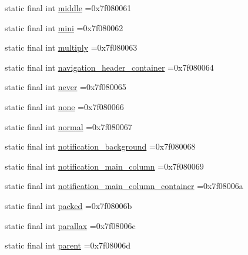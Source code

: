 \begin{DoxyCompactItemize}
\item 
static final int \mbox{\hyperlink{classbr_1_1unb_1_1cic_1_1mp_1_1marketmaster_1_1test_1_1R_1_1id_a30ed33f600cfdfe1e1e93c06ca85b615}{middle}} =0x7f080061
\item 
static final int \mbox{\hyperlink{classbr_1_1unb_1_1cic_1_1mp_1_1marketmaster_1_1test_1_1R_1_1id_a212afa822e93a022b91e2719dd830212}{mini}} =0x7f080062
\item 
static final int \mbox{\hyperlink{classbr_1_1unb_1_1cic_1_1mp_1_1marketmaster_1_1test_1_1R_1_1id_a615e34590418e5833ce313aa5db8ab72}{multiply}} =0x7f080063
\item 
static final int \mbox{\hyperlink{classbr_1_1unb_1_1cic_1_1mp_1_1marketmaster_1_1test_1_1R_1_1id_a7eee101e7bb5f10f92fb23ff621f5325}{navigation\+\_\+header\+\_\+container}} =0x7f080064
\item 
static final int \mbox{\hyperlink{classbr_1_1unb_1_1cic_1_1mp_1_1marketmaster_1_1test_1_1R_1_1id_acda4774f6fd52de6093de3df096b0c01}{never}} =0x7f080065
\item 
static final int \mbox{\hyperlink{classbr_1_1unb_1_1cic_1_1mp_1_1marketmaster_1_1test_1_1R_1_1id_a6105b12cfc835b7c0d78eca4993d8820}{none}} =0x7f080066
\item 
static final int \mbox{\hyperlink{classbr_1_1unb_1_1cic_1_1mp_1_1marketmaster_1_1test_1_1R_1_1id_a3c60b4887100a9e460b560ef246dc721}{normal}} =0x7f080067
\item 
static final int \mbox{\hyperlink{classbr_1_1unb_1_1cic_1_1mp_1_1marketmaster_1_1test_1_1R_1_1id_a057402f9ac099cb530589a56564347e9}{notification\+\_\+background}} =0x7f080068
\item 
static final int \mbox{\hyperlink{classbr_1_1unb_1_1cic_1_1mp_1_1marketmaster_1_1test_1_1R_1_1id_ad8187936fcfe377eed48d738a26e8089}{notification\+\_\+main\+\_\+column}} =0x7f080069
\item 
static final int \mbox{\hyperlink{classbr_1_1unb_1_1cic_1_1mp_1_1marketmaster_1_1test_1_1R_1_1id_ae2d2859d603d05dbe679106258cc43b9}{notification\+\_\+main\+\_\+column\+\_\+container}} =0x7f08006a
\item 
static final int \mbox{\hyperlink{classbr_1_1unb_1_1cic_1_1mp_1_1marketmaster_1_1test_1_1R_1_1id_ab9414b6a8c88d6129786bf9b9a61115f}{packed}} =0x7f08006b
\item 
static final int \mbox{\hyperlink{classbr_1_1unb_1_1cic_1_1mp_1_1marketmaster_1_1test_1_1R_1_1id_a50a07c359d894d65c2d630164f94ecad}{parallax}} =0x7f08006c
\item 
static final int \mbox{\hyperlink{classbr_1_1unb_1_1cic_1_1mp_1_1marketmaster_1_1test_1_1R_1_1id_accac19bdc3e86a3eaa2aecdddf4b6aec}{parent}} =0x7f08006d

\end{DoxyCompactItemize}
